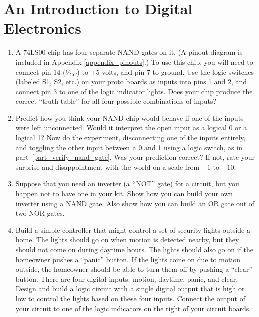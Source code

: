 \section{An Introduction to Digital Electronics}
\label{lab_digital_electronics}


\bigskip

\begin{enumerate}[wide]

\item A 74LS00 chip has four separate NAND gates on it.  (A pinout diagram is included in Appendix \ref{appendix_pinouts}.) To use this chip, you will need to connect pin 14 ($V_{CC}$) to $+5$ volts, and pin 7 to ground.  Use the logic switches (labeled S1, S2, etc.) on your proto boards as inputs into pins 1 and 2, and connect pin 3 to one of the logic indicator lights.  Does your chip produce the correct ``truth table'' for all four possible combinations of inputs?\label{part_verify_nand_gate}

\item Predict how you think your NAND chip would behave if one of the inputs were left unconnected.  Would it interpret the open input as a logical 0 or a logical 1?  Now do the experiment, disconnecting one of the inputs entirely, and toggling the other input between a 0 and 1 using a logic switch, as in part~\ref{part_verify_nand_gate}.  Was your prediction correct?  If not, rate your surprise and disappointment with the world on a scale from $-1$ to $-10$. 

\item Suppose that you need an inverter (a ``NOT'' gate) for a circuit, but you happen not to have one in your kit.  Show how you can build your own inverter using a NAND gate.  Also show how you can build an OR gate out of two NOR gates.

\item Build a simple controller that might control a set of security lights outside a home.  The lights should go on when motion is detected nearby, but they should not come on during daytime hours.  The lights should also go on if the homeowner pushes a ``panic'' button.  If the lights come on due to motion outside, the homeowner should be able to turn them off by pushing a ``clear'' button.  There are four digital inputs: motion, daytime, panic, and clear.  Design and build a logic circuit with a single digital output that is high or low to control the lights based on these four inputs.  Connect the output of your circuit to one of the logic indicators on the right of your circuit boards.


\end{enumerate}

